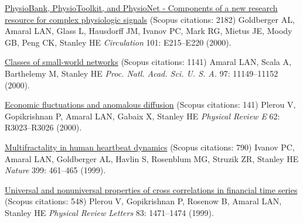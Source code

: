 \NumberedItem{\makebox[0.8cm][r]{[33]}}
\href{/people/amaral/physiobank-physiotoolkit-and-physionet-components-of-a-new-research-resource-for-complex-physiologic-signals}
{PhysioBank, PhysioToolkit, and PhysioNet - Components of a new research resource for complex physiologic signals}
    (Scopus citations: 2182)
\newline
Goldberger AL, Amaral LAN, Glass L, Hausdorff JM, Ivanov PC, Mark RG, Mietus JE, Moody GB, Peng CK, Stanley HE
\newline
\textit{Circulation}
    101:
E215--E220 (2000).
\newline
\Gap
~
\Gap

\NumberedItem{\makebox[0.8cm][r]{[32]}}
\href{/people/amaral/classes-of-small-world-networks}
{Classes of small-world networks}
    (Scopus citations: 1141)
\newline
Amaral LAN, Scala A, Barthelemy M, Stanley HE
\newline
\textit{Proc. Natl. Acad. Sci. U. S. A.}
    97:
11149--11152 (2000).
\newline
\Gap
~
\Gap

\NumberedItem{\makebox[0.8cm][r]{[31]}}
\href{/people/amaral/economic-fluctuations-and-anomalous-diffusion}
{Economic fluctuations and anomalous diffusion}
    (Scopus citations: 141)
\newline
Plerou V, Gopikrishnan P, Amaral LAN, Gabaix X, Stanley HE
\newline
\textit{Physical Review E}
    62:
R3023--R3026 (2000).
\newline
\Gap
~
\Gap

\NumberedItem{\makebox[0.8cm][r]{[30]}}
\href{/people/amaral/multifractality-in-human-heartbeat-dynamics}
{Multifractality in human heartbeat dynamics}
    (Scopus citations: 790)
\newline
Ivanov PC, Amaral LAN, Goldberger AL, Havlin S, Rosenblum MG, Struzik ZR, Stanley HE
\newline
\textit{Nature}
    399:
461--465 (1999).
\newline
\Gap
~
\Gap

\NumberedItem{\makebox[0.8cm][r]{[29]}}
\href{/people/amaral/universal-and-nonuniversal-properties-of-cross-correlations-in-financial-time-series}
{Universal and nonuniversal properties of cross correlations in financial time series}
    (Scopus citations: 548)
\newline
Plerou V, Gopikrishnan P, Rosenow B, Amaral LAN, Stanley HE
\newline
\textit{Physical Review Letters}
    83:
1471--1474 (1999).
\newline
\Gap
~
\Gap

